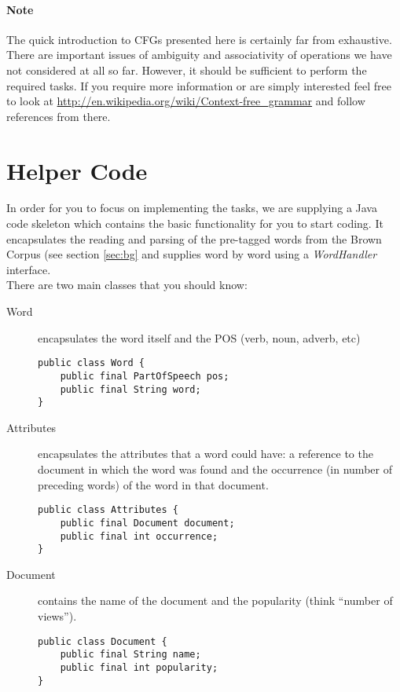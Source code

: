 \documentclass[11pt]{article}
\begin{document}
\paragraph{Note} The quick introduction to CFGs presented here is certainly far from exhaustive. There are important issues of ambiguity and associativity of operations we have not considered at all so far. However, it should be sufficient to perform the required tasks. If you require more information or are simply interested feel free to look at \url{http://en.wikipedia.org/wiki/Context-free_grammar} and follow references from there.

\section{Helper Code}
In order for you to focus on implementing the tasks, we are supplying a Java code skeleton which contains the basic functionality for you to start coding. It encapsulates the reading and parsing of the pre-tagged words from the Brown Corpus (see section \ref{sec:bg} and supplies word by word using a \textit{WordHandler} interface.\\

There are two main classes that you should know:
\begin{description}
\item[Word] encapsulates the word itself and the POS (verb, noun, adverb, etc)

\begin{lstlisting}
public class Word {
    public final PartOfSpeech pos;
    public final String word;
}
\end{lstlisting}

\item[Attributes] encapsulates the attributes that a word could have: a reference to the document in which the word was found and the occurrence (in number of preceding words) of the word in that document.
\begin{lstlisting}
public class Attributes {
    public final Document document;
    public final int occurrence;
}
\end{lstlisting}
\item[Document] contains the name of the document and the popularity (think ``number of views'').
\begin{lstlisting}
public class Document {
    public final String name;
    public final int popularity;
}
\end{lstlisting}
\end{description}
\end{document}
